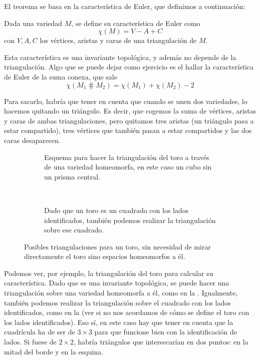\documentclass[palatino, bibnumbers]{apuntes}
\begin{document}
El teorema se basa en la característica de Euler, que definimos a continuación:

\begin{defn} \label{def:CaracteristicaEuler} Dada una variedad $M$, se define su característica de Euler como \[ χ(M) = V - A + C\] con $V, A, C$ los vértices, aristas y caras de una triangulación de $M$. \end{defn}

Esta característica es una invariante topológica, y además no depende de la triangulación. Algo que se puede dejar como ejercicio es el hallar la característica de Euler de la suma conexa, que sale \[ χ(M_1 \hash M_2) = χ(M_1) + χ(M_2) - 2 \]

Para sacarlo, habría que tener en cuenta que cuando se unen dos variedades, lo hacemos quitando un triángulo. Es decir, que cogemos la suma de vértices, aristas y caras de ambas triangulaciones, pero quitamos tres aristas (un triángulo pasa a estar compartido), tres vértices que también pasan a estar compartidos y las dos caras desaparecen.

\begin{figure}[hbtp]
\begin{subfigure}{0.5\textwidth}
\centering
{}
\caption{Esquema para hacer la triangulación del toro a través de una variedad homeomorfa, en este caso un cubo sin un prisma central.}
\label{fig:TriangulacionToroPrisma}
\end{subfigure}
~
\begin{subfigure}{0.5\textwidth}
\centering
\caption{Dado que un toro es un cuadrado con los lados identificados, también podemos realizar la triangulación sobre ese cuadrado.}
\label{fig:TriangulacionToroPlano}
\end{subfigure}
\caption{Posibles triangulaciones para un toro, sin necesidad de mirar directamente el toro sino espacios homeomorfos a él.}
\label{fig:Triangulacion}
\end{figure}

Podemos ver, por ejemplo, la triangulación del toro para calcular su característica. Dado que es una invariante topológica, se puede hacer una triangulación sobre una variedad homeomorfa a él, como en la . Igualmente, también podemos realizar la triangulación sobre el cuadrado con los lados identificados, como en la  (ver  si no nos acordamos de cómo se define el toro con los lados identificados). Eso sí, en este caso hay que tener en cuenta que la cuadrícula ha de ser de $3×3$ para que funcione bien con la identificación de lados. Si fuese de $2×2$, habría triángulos que intersecarían en dos puntos: en la mitad del borde y en la esquina.
\end{document}
